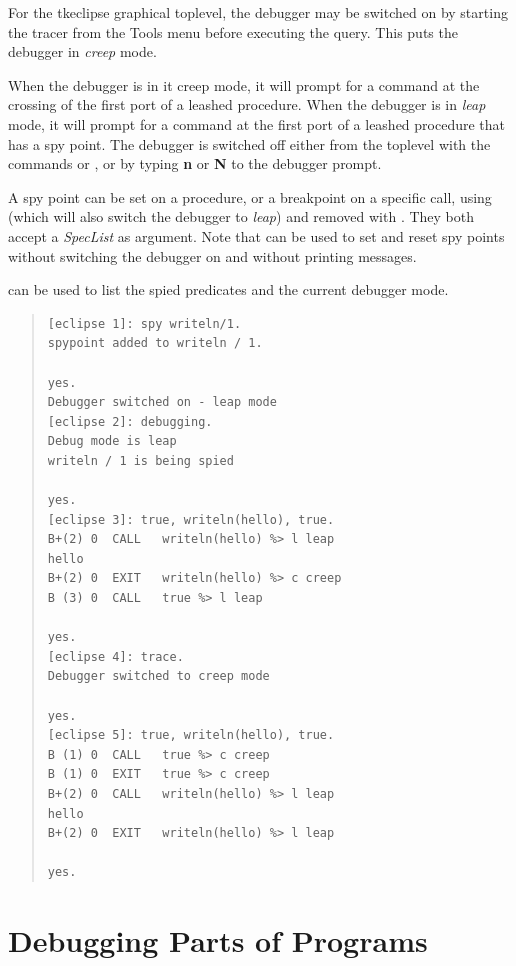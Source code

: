 For the tkeclipse graphical toplevel, the debugger may be switched on by
starting the tracer from the Tools menu before executing the query. This
puts the debugger in {\it creep} mode. 

When the debugger is in {it creep} mode, it will
prompt for a command at the crossing of the first
port of a
leashed procedure.  When the debugger is in {\it leap} mode,
it will prompt for a command at the first port of a leashed
procedure that has a spy point.  The debugger is switched off either
from the toplevel with the commands
 or
, or by
typing {\bf n} or {\bf N} to the debugger prompt.

A spy point can be set on a procedure, or a breakpoint on a specific call,  using
 (which will
 also switch the debugger to {\it leap})
and removed
with .  They
both accept a {\it SpecList} as argument.  Note that
 can
be used to set and reset spy points without switching the debugger on
and without printing messages.

 can be
used to list the spied predicates and the current debugger mode.

\begin{quote}\begin{verbatim}
[eclipse 1]: spy writeln/1.
spypoint added to writeln / 1.

yes.
Debugger switched on - leap mode
[eclipse 2]: debugging.
Debug mode is leap
writeln / 1 is being spied

yes.
[eclipse 3]: true, writeln(hello), true.
B+(2) 0  CALL   writeln(hello) %> l leap
hello
B+(2) 0  EXIT   writeln(hello) %> c creep
B (3) 0  CALL   true %> l leap

yes.
[eclipse 4]: trace.
Debugger switched to creep mode

yes.
[eclipse 5]: true, writeln(hello), true.
B (1) 0  CALL   true %> c creep
B (1) 0  EXIT   true %> c creep
B+(2) 0  CALL   writeln(hello) %> l leap
hello
B+(2) 0  EXIT   writeln(hello) %> l leap

yes.
\end{verbatim}\end{quote}

\section{Debugging Parts of Programs}

